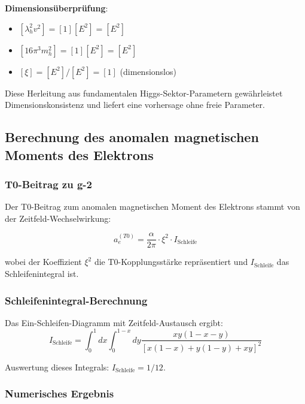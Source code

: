 \documentclass[12pt,a4paper]{article}
\begin{document}
\textbf{Dimensionsüberprüfung}:
\begin{itemize}
	\item $[\lambda_h^2 v^2] = [1][E^2] = [E^2]$
	\item $[16\pi^3 m_h^2] = [1][E^2] = [E^2]$
	\item $[\xi] = [E^2]/[E^2] = [1]$ (dimensionslos) \checkmark
\end{itemize}

Diese Herleitung aus fundamentalen Higgs-Sektor-Parametern gewährleistet Dimensionskonsistenz und liefert eine vorhersage ohne freie Parameter.

\subsection{Berechnung des anomalen magnetischen Moments des Elektrons}
\label{subsec:elektron_g2_berechnung}

\subsubsection{T0-Beitrag zu g-2}
\label{subsubsec:t0_g2_beitrag}

Der T0-Beitrag zum anomalen magnetischen Moment des Elektrons stammt von der Zeitfeld-Wechselwirkung:

\begin{equation}
	a_e^{(T0)} = \frac{\alpha}{2\pi} \cdot \xi^2 \cdot I_{\text{Schleife}}
	\label{eq:t0_g2_allgemein}
\end{equation}

wobei der Koeffizient $\xi^2$ die T0-Kopplungsstärke repräsentiert und $I_{\text{Schleife}}$ das Schleifenintegral ist.

\subsubsection{Schleifenintegral-Berechnung}
\label{subsubsec:schleifen_berechnung}

Das Ein-Schleifen-Diagramm mit Zeitfeld-Austausch ergibt:
\begin{equation}
	I_{\text{Schleife}} = \int_0^1 dx \int_0^{1-x} dy \frac{xy(1-x-y)}{[x(1-x) + y(1-y) + xy]^2}
	\label{eq:schleifen_integral}
\end{equation}

Auswertung dieses Integrals: $I_{\text{Schleife}} = 1/12$.

\subsubsection{Numerisches Ergebnis}
\label{subsubsec:numerisches_ergebnis}
\end{document}
